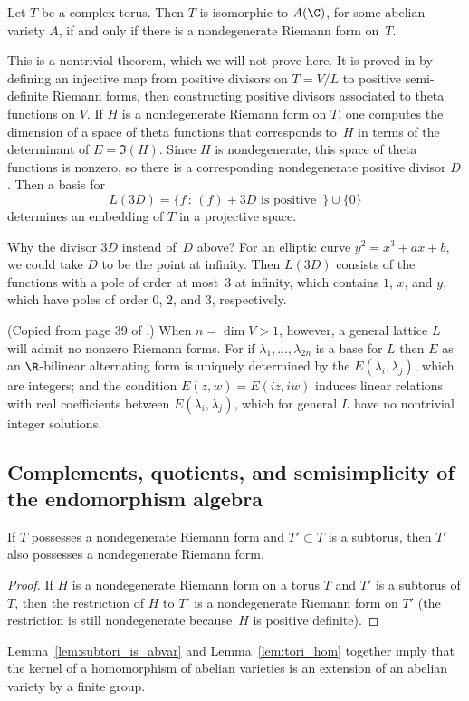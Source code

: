 \documentclass{report}
\begin{document}
\begin{theorem}
Let $T$ be a complex torus.  Then $T$ is isomorphic to $A(\C)$,
for some abelian variety $A$, if and only if there is a
nondegenerate Riemann form on~$T$.
\end{theorem}
This is a nontrivial theorem, which we will not prove here.   It
is proved in \cite[Ch.2]{swinnerton-dyer:abvars} by defining an
injective map from positive divisors on $T=V/L$ to positive
semi-definite Riemann forms, then constructing positive divisors
associated to theta functions on $V$.  If $H$ is a nondegenerate
Riemann form on $T$, one computes the dimension of a space of
theta functions that corresponds to~$H$ in terms of the
determinant of $E=\Im(H)$. Since $H$ is nondegenerate, this space
of theta functions is nonzero, so there is a corresponding
nondegenerate positive divisor $D$.  Then a basis for
\[L(3D)=\{f \,:\, (f) + 3D\text{ is positive }\,\}\cup \{0\}\]
determines an embedding of $T$ in a projective space.

Why the divisor $3D$ instead of~$D$ above? For an elliptic curve
$y^2=x^3+ax+b$, we could take $D$ to be the point at infinity.
Then $L(3D)$ consists of the functions with a pole of order at
most~$3$ at infinity, which contains $1$, $x$, and $y$, which have
poles of order $0$, $2$, and $3$, respectively.


\begin{remark} (Copied from page 39 of
\cite{swinnerton-dyer:abvars}.) When $n=\dim V>1$, however, a
general lattice $L$ will admit no nonzero Riemann forms.  For if
$\lambda_1,\ldots, \lambda_{2n}$ is a base for $L$ then $E$ as an
$\R$-bilinear alternating form is uniquely determined by the
$E(\lambda_i,\lambda_j)$, which are integers; and the condition
$E(z,w)=E(iz,iw)$ induces linear relations with real coefficients
between $E(\lambda_i,\lambda_j)$, which for general $L$ have no
nontrivial integer solutions.
\end{remark}

\subsection{Complements, quotients, and semisimplicity of the endomorphism algebra}

\begin{lemma}\label{lem:subtori_is_abvar}
If $T$ possesses a nondegenerate Riemann form and $T'\subset T$ is
a subtorus, then $T'$ also possesses a nondegenerate Riemann form.
\end{lemma}
\begin{proof}
If $H$ is a nondegenerate Riemann form on a torus $T$ and $T'$ is
a subtorus of $T$, then the restriction of $H$ to $T'$ is a
nondegenerate Riemann form on $T'$ (the restriction is still
nondegenerate because~$H$ is positive definite).
\end{proof}
 Lemma~\ref{lem:subtori_is_abvar} and
Lemma~\ref{lem:tori_hom} together imply that the kernel of a
homomorphism of abelian varieties is an extension of an abelian
variety by a finite group.
\end{document}
